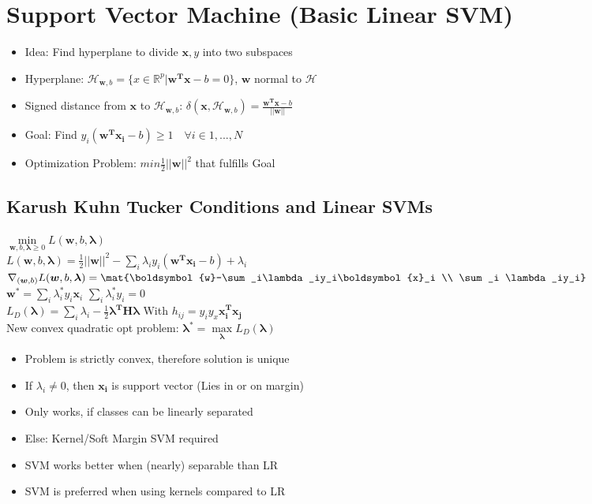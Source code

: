 \documentclass[english]{latex4ei/latex4ei_sheet}
\begin{document}
\section{Support Vector Machine (Basic Linear SVM)}
\begin{sectionbox}
    \begin{itemize}
        \item Idea: Find hyperplane to divide $\boldsymbol{x}, y$ into two subspaces
        \item Hyperplane: $\mathcal{H}_{\boldsymbol{w},b}=\{x\in \mathbb{R}^p | \boldsymbol{w^Tx}-b=0\}$, $\boldsymbol{w}$ normal to $\mathcal{H}$
        \item Signed distance from $\boldsymbol{x}$ to $\mathcal{H}_{\boldsymbol{w},b}$: $\delta(\boldsymbol{x}, \mathcal{H}_{\boldsymbol{w},b})=\frac{\boldsymbol{w^Tx}-b}{||\boldsymbol{w}||}$
        \item Goal: Find $y_i(\boldsymbol{w^Tx_i}-b)\ge 1\quad \forall i \in 1,...,N$
        \item Optimization Problem: $min \frac{1}{2}||\boldsymbol{w}||^2$ that fulfills Goal
    \end{itemize}
    \subsection{Karush Kuhn Tucker Conditions and Linear SVMs}
    \begin{emphbox}
    		$\min\limits_{\boldsymbol{w}, b, \boldsymbol{\lambda}\ge0} L(\boldsymbol{w}, b, \boldsymbol{\lambda})$ \\ 
    		$L(\boldsymbol{w}, b, \boldsymbol{\lambda})= \frac{1}{2}||\boldsymbol{w}||^2 - \sum\limits_i \lambda_i y_i(\boldsymbol{w^Tx_i}-b)+\lambda_i $\\
    		$\nabla_{(\boldsymbol{w},b)}L(\boldsymbol{w}, b, \boldsymbol{\lambda})=\mat{\boldsymbol{w}-\sum_i\lambda_iy_i\boldsymbol{x}_i \\ \sum_i \lambda_iy_i}$\\
			$\boldsymbol{w^*}=\sum_i\lambda^*_iy_i\boldsymbol{x}_i$  \quad $\sum_i \lambda^*_iy_i = 0$\\
			$L_D(\boldsymbol{\lambda})=\sum_i\lambda_i-\frac{1}{2}\boldsymbol{\lambda^TH\lambda}$ \quad With $h_{ij}=y_iy_x\boldsymbol{x_i^Tx_j}$\\
			New convex quadratic opt problem: $\boldsymbol{\lambda^*}=\max\limits_{\boldsymbol{\lambda}}L_D(\boldsymbol{\lambda})$
	\end{emphbox}
	\begin{itemize}
	    \item Problem is strictly convex, therefore solution is unique
	    \item If $\lambda_i \ne 0$, then $\boldsymbol{x_i}$ is support vector (Lies in or on margin)
	    \item Only works, if classes can be linearly separated 
	    \item Else: Kernel/Soft Margin SVM required
	    \item SVM works better when (nearly) separable than LR
	    \item SVM is preferred when using kernels compared to LR
	\end{itemize}
\end{sectionbox}
\end{document}

